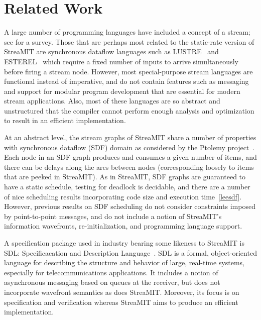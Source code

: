 \section{Related Work}
\label{sec:related}
A large number of programming languages have included a concept of a
stream; see \cite{survey97} for a survey.  Those that are perhaps most
related to the static-rate version of StreaMIT are synchronous
dataflow languages such as LUSTRE~\cite{lustre} and
ESTEREL~\cite{esterel92} which require a fixed number of inputs to
arrive simultaneously before firing a stream node.  However, most
special-purpose stream languages are functional instead of imperative,
and do not contain features such as messaging and support for modular
program development that are essential for modern stream applications.
Also, most of these languages are so abstract and unstructured that
the compiler cannot perform enough analysis and optimization to result
in an efficient implementation.

At an abstract level, the stream graphs of StreaMIT share a number of
properties with synchronous dataflow (SDF) domain as considered by the
Ptolemy project~\cite{ptolemyoverview}.  Each node in an SDF graph
produces and consumes a given number of items, and there can be delays
along the arcs between nodes (corresponding loosely to items that are
peeked in StreaMIT).  As in StreaMIT, SDF graphs are guaranteed to
have a static schedule, testing for deadlock is decidable, and there
are a number of nice scheduling results incorporating code size and
execution time~\ref{leesdf}.  However, previous results on SDF
scheduling do not consider constraints imposed by point-to-point
messages, and do not include a notion of StreaMIT's information
wavefronts, re-initialization, and programming language support.

A specification package used in industry bearing some likeness to
StreaMIT is SDL: Specificacation and Description
Language~\cite{sdlrec}.  SDL is a formal, object-oriented language for
describing the structure and behavior of large, real-time systems,
especially for telecommunications applications.  It includes a notion
of asynchronous messaging based on queues at the receiver, but does
not incorporate wavefront semantics as does StreaMIT.  Moreover, its
focus is on specification and verification whereas StreaMIT aims to
produce an efficient implementation.

